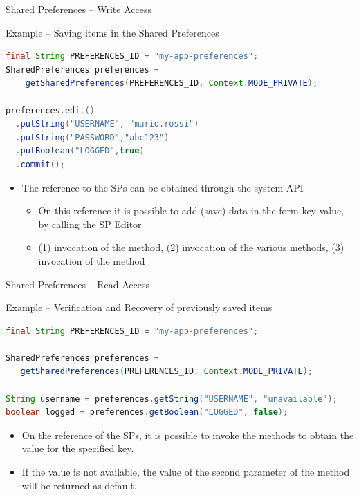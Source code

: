 \documentclass{beamer}
\begin{document}
\begin{frame}[fragile]{Shared Preferences -- Write Access}
  \begin{exampleblock}{Example -- Saving items in the Shared Preferences}
    \begin{lstlisting}[language=Java]  		        
final String PREFERENCES_ID = "my-app-preferences";
SharedPreferences preferences =
    getSharedPreferences(PREFERENCES_ID, Context.MODE_PRIVATE);

preferences.edit()
  .putString("USERNAME", "mario.rossi")
  .putString("PASSWORD","abc123")
  .putBoolean("LOGGED",true)
  .commit();
    \end{lstlisting}
  \end{exampleblock}
  \begin{itemize}
    \item The reference to the SPs can be obtained through the system API
    \begin{itemize}
      \item On this reference it is possible to add (save) data in the form key-value, by calling the SP Editor
      \item (1) invocation of the  method, (2) invocation of the
      various  methods, (3) invocation of the 
      method
    \end{itemize}
  \end{itemize}
\end{frame}

  \begin{frame}[fragile]{Shared Preferences -- Read Access}
    \begin{exampleblock}{Example -- Verification and Recovery of previously saved items}
      \begin{lstlisting}[language=Java]  		        
final String PREFERENCES_ID = "my-app-preferences";
        
SharedPreferences preferences =
   getSharedPreferences(PREFERENCES_ID, Context.MODE_PRIVATE);

String username = preferences.getString("USERNAME", "unavailable");
boolean logged = preferences.getBoolean("LOGGED", false);
      \end{lstlisting}
    \end{exampleblock}
    \begin{itemize}
      \item On the reference of the SPs, it is possible to invoke the
       methods to obtain the value for the specified key.
      \item If the value is not available, the value of the second parameter of
      the  method will be returned as default.
    \end{itemize}
  \end{frame}
\end{document}

